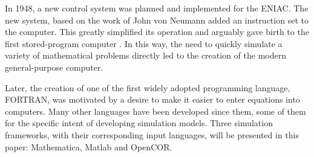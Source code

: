 \documentclass[\rootfolder/main.tex]{subfiles}
\begin{document}
In 1948, a new control system was planned and implemented for the ENIAC.
The new system, based on the work of John von Neumann \cite{VonNeumann1993} \cite{Haigh2014a} added an instruction set to the computer.
This greatly simplified its operation and arguably gave birth to the first stored-program computer \cite{Rope2007}.
In this way, the need to quickly simulate a variety of mathematical problems directly led to the creation of the modern general-purpose computer.

Later, the creation of one of the first widely adopted programming language, FORTRAN, was motivated by a desire to make it easier to enter equations into computers.
Many other languages have been developed since them, some of them for the specific intent of developing simulation models.
Three simulation frameworks, with their corresponding input languages, will be presented in this paper: Mathematica, Matlab and OpenCOR.
\end{document}
